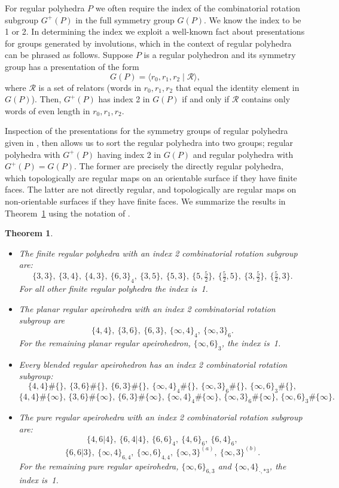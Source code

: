 \documentclass[12pt]{article}
\newtheorem{theorem}{Theorem}[section]
\theoremstyle{definition}\newtheorem{definition}{Definition}[section]
\begin{document}
For regular polyhedra $P$ we often require the index of the combinatorial rotation subgroup $G^+(P)$ in the full symmetry group $G(P)$. We know the index to be 1 or 2. In determining the index we exploit a well-known fact about presentations for groups generated by involutions, which in the context of regular polyhedra can be phrased as follows. Suppose $P$ is a regular polyhedron and its symmetry group has a presentation of the form 
\[G(P) = \langle r_0,r_1,r_2\mid \mathcal{R} \rangle,\] where $\mathcal{R}$ is a set of relators (words in $r_0,r_1,r_2$ that equal the identity element in $G(P)$). Then, $G^+(P)$ has index 2 in $G(P)$ if and only if $\mathcal{R}$ contains only words of even length in $r_0,r_1,r_2$.
\smallskip

Inspection of the presentations for the symmetry groups of regular polyhedra given in \cite[Ch. 7E]{41}, then allows us to sort the regular polyhedra into two groups; regular polyhedra with $G^+(P)$ having index 2 in $G(P)$ and regular polyhedra with $G^+(P) = G(P)$. The former are precisely the directly regular polyhedra, which topologically are regular maps on an orientable surface if they have finite faces. The latter are not directly regular, and topologically are regular maps on non-orientable surfaces if they have finite faces. We summarize the results in Theorem~\ref{index2summ} using the notation of \cite[Ch. 7E]{41}.
\smallskip

\begin{theorem}
\label{index2summ}
\noindent\begin{itemize}
\item[(a)] The finite regular polyhedra with an index 2 combinatorial rotation subgroup are: 
$$\{3,3\}, \ \{3,4\}, \ \{4,3\}, \ \{6,3\}_4, \ \{3,5\}, \ \{5,3\}, \ \{5,\tfrac{5}{2}\}, \ \{\tfrac{5}{2},5\}, \ \{3,\tfrac{5}{2}\}, \ \{\tfrac{5}{2},3\}.$$
For all other finite regular polyhedra the index is~1. 
\item[(b)] The planar regular apeirohedra with an index 2 combinatorial rotation subgroup are 
$$\{4,4\}, \ \{3,6\}, \ \{6,3\}, \ \{\infty,4\}_4, \ \{\infty,3\}_6.$$ 
For the remaining planar regular apeirohedron, $\{\infty,6\}_3$, the index is~1.
\item[(c)] Every blended regular apeirohedron has an index 2 combinatorial rotation subgroup: 
$$\{4,4\}\#\{\}, \ \{3,6\}\#\{\}, \ \{6,3\}\#\{\}, \ \{\infty,4\}_4\#\{\}, \ \{\infty,3\}_6\#\{\}, \ \{\infty,6\}_3\#\{\},$$ 
$$\{4,4\}\#\{\infty\}, \, \{3,6\}\#\{\infty\}, \, \{6,3\}\#\{\infty\}, \, \{\infty,4\}_4\#\{\infty\}, \, \{\infty,3\}_6\#\{\infty\}, \, \{\infty,6\}_3\#\{\infty\}.$$
\item[(d)] The pure regular apeirohedra with an index 2 combinatorial rotation subgroup are: 
$$\{4,6|4\}, \ \{6,4|4\}, \ \{6,6\}_4, \ \{4,6\}_6, \ \{6,4\}_6,$$ $$\{6,6|3\}, \ \{\infty,4\}_{6,4}, \ \{\infty,6\}_{4,4}, \ \{\infty,3\}^{(a)}, \ \{\infty,3\}^{(b)}.$$ For the remaining pure regular apeirohedra, $\{\infty,6\}_{6,3}$ and $\{\infty, 4\}_{\cdot,*3}$, the index is~1.
\end{itemize}
\end{theorem}
\smallskip
\end{document}
